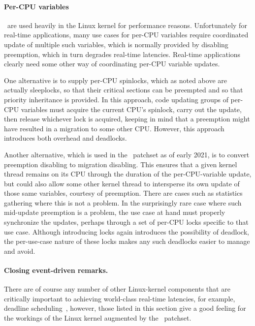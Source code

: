 \paragraph{Per-CPU variables}\ are used heavily in the Linux kernel
for performance reasons.
Unfortunately for real-time applications, many use cases for per-CPU
variables require coordinated update of multiple such variables,
which is normally provided by disabling preemption, which in turn
degrades real-time latencies.
Real-time applications clearly need some other way of coordinating
per-CPU variable updates.

One alternative is to supply per-CPU spinlocks, which as noted above
are actually sleeplocks, so that their critical sections can be
preempted and so that priority inheritance is provided.
In this approach, code updating groups of per-CPU variables must
acquire the current CPU's spinlock, carry out the update, then
release whichever lock is acquired, keeping in mind that a preemption
might have resulted in a migration to some other CPU\@.
However, this approach introduces both overhead and deadlocks.

Another alternative, which is used in the \rt\ patchset as of early 2021,
is to convert preemption disabling to migration disabling.
This ensures that a given kernel thread remains on its CPU through
the duration of the per-CPU-variable update, but could also allow some
other kernel thread to intersperse its own update of those same variables,
courtesy of preemption.
There are cases such as statistics gathering where this is not a problem.
In the surprisingly rare case where such mid-update preemption is a problem,
the use case at hand must properly synchronize the updates, perhaps through
a set of per-CPU locks specific to that use case.
Although introducing locks again introduces the possibility of deadlock,
the per-use-case nature of these locks makes any such deadlocks easier
to manage and avoid.

\paragraph{Closing event-driven remarks.}
There are of course any number of other Linux-kernel components that are
critically important to achieving world-class real-time latencies,
for example, deadline
scheduling~\cite{DanielBristot2018deadlinesched-1,DanielBristot2018deadlinesched-2},
however, those listed in this section give a good feeling for the workings
of the Linux kernel augmented by the \rt\ patchset.

